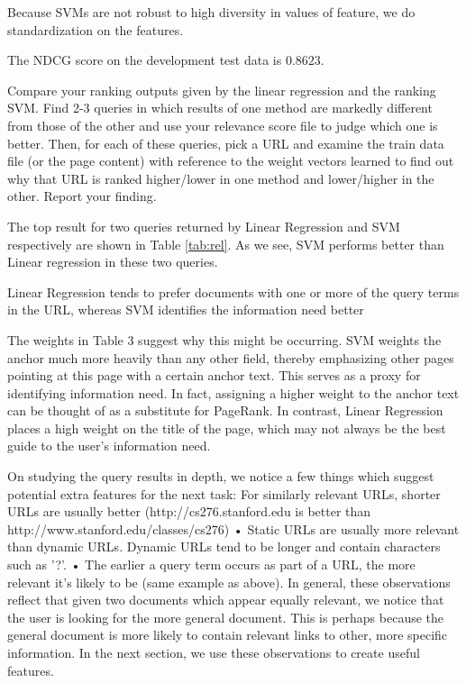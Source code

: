 Because SVMs are not robust to high diversity in values of feature,
we do standardization on the features.

The NDCG score on the development test data is $0.8623$.


Compare your ranking outputs given by the linear regression and the ranking SVM.
Find 2-3 queries in which results of one method are markedly different from those
of the other and use your relevance score file to judge which one is better.
Then, for each of these queries, pick a URL and examine the train data file (or the
page content) with reference to the weight vectors learned to find out why that
URL is ranked higher/lower in one method and lower/higher in the other. Report
your finding.

The top result for two queries returned by Linear Regression and SVM respectively are shown in Table \ref{tab:rel}. As we see, SVM performs better than Linear regression in these two queries.

Linear Regression tends to prefer documents with one or more of the
query terms in the URL, whereas SVM identifies the information need better

The weights in Table 3 suggest why this might be occurring. SVM weights the anchor much more
heavily than any other field, thereby emphasizing other pages pointing at this page with a certain
anchor text. This serves as a proxy for identifying information need. In fact, assigning a higher weight
to the anchor text can be thought of as a substitute for PageRank. In contrast, Linear Regression
places a high weight on the title of the page, which may not always be the best guide to the user’s
information need.

On studying the query results in depth, we notice a few things which suggest potential extra features
for the next task:
For similarly relevant URLs, shorter URLs are usually better (http://cs276.stanford.edu is
better than http://www.stanford.edu/classes/cs276)
• Static URLs are usually more relevant than dynamic URLs. Dynamic URLs tend to be longer
and contain characters such as ’?’.
• The earlier a query term occurs as part of a URL, the more relevant it’s likely to be (same
example as above).
In general, these observations reflect that given two documents which appear equally relevant, we
notice that the user is looking for the more general document. This is perhaps because the general
document is more likely to contain relevant links to other, more specific information. In the next
section, we use these observations to create useful features.




